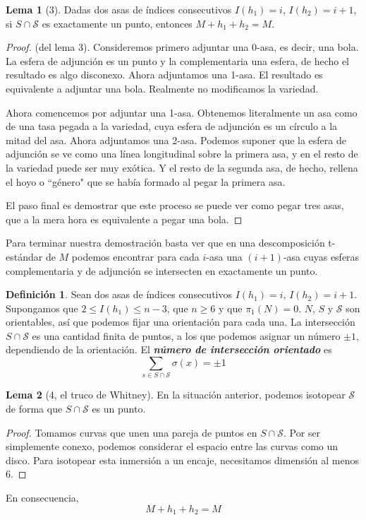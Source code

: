\documentclass[spanish]{book}
\theoremstyle{definition}
\newtheorem*{defn}{Definición}
\newtheorem*{lema}{Lema}
\begin{document}
\begin{lema}[3]
	Dadas dos asas de índices consecutivos $I(h_1)=i$, $I(h_2)=i+1$, si $S\cap\mathcal{S}$ es exactamente un punto, entonces $M+h_1+h_2=M$.
\end{lema}
\begin{proof}
	(del lema 3). Consideremos primero adjuntar una 0-asa, es decir, una bola. La esfera de adjunción es un punto y la complementaria una esfera, de hecho el resultado es algo disconexo. Ahora adjuntamos una 1-asa. El resultado es equivalente a adjuntar una bola. Realmente no modificamos la variedad.
	
	Ahora comencemos por adjuntar una 1-asa. Obtenemos literalmente un asa como de una tasa pegada a la variedad, cuya esfera de adjunción es un círculo a la mitad del asa. Ahora adjuntamos una 2-asa. Podemos suponer que la esfera de adjunción se ve como una línea longitudinal sobre la primera asa, y en el resto de la variedad puede ser muy exótica. Y el resto de la segunda asa, de hecho, rellena el hoyo o ``género" que se había formado al pegar la primera asa.
	
	El paso final es demostrar que este proceso se puede ver como pegar tres asas, que a la mera hora es equivalente a pegar una bola.
\end{proof}

Para terminar nuestra demostración basta ver que en una descomposición t-estándar de $M$ podemos encontrar para cada $i$-asa una $(i+1)$-asa cuyas esferas complementaria y de adjunción se intersecten en exactamente un punto.

\begin{defn}
	Sean dos asas de índices consecutivos $I(h_1)=i$, $I(h_2)=i+1$. Supongamos que $2\leq I(h_1)\leq n-3$, que $n\geq6$ y que $\pi_1(N)=0$. $N$, $S$ y $\mathcal{S}$ son orientables, así que podemos fijar una orientación para cada una. La intersección $S\cap\mathcal{S}$ es una cantidad finita de puntos, a los que podemos asignar un número $\pm1$, dependiendo de la orientación. El \textbf{\textit{número de intersección orientado}} es
	\[\sum_{s\in S\cap \mathcal{S}}\sigma(x)=\pm1\]
\end{defn}
\begin{lema}[4, el truco de Whitney]
	En la situación anterior, podemos isotopear $\mathcal{S}$ de forma que $S\cap \mathcal{S}$ es un punto.
\end{lema}
\begin{proof}
	Tomamos curvas que unen una pareja de puntos en $S\cap \mathcal{S}$. Por ser simplemente conexo, podemos considerar el espacio entre las curvas como un disco. Para isotopear esta inmersión a un encaje, necesitamos dimensión al menos 6.
\end{proof}
En consecuencia,
\[M+h_1+h_2=M\]
\end{document}
